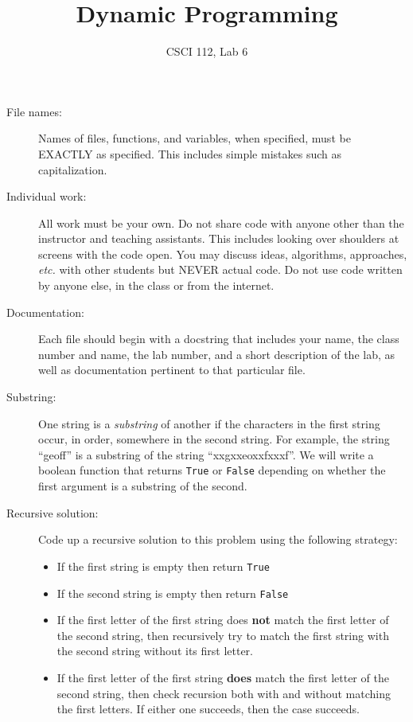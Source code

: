 \documentclass{article}
\title{Dynamic Programming}
\author{CSCI 112, Lab 6}
\date{}
\begin{document}
\sloppy

\maketitle

\begin{description} 
\item[File names:]  Names of files, functions, and variables, 
when specified,
must be EXACTLY as specified.  This includes simple mistakes such
as capitalization.

\item[Individual work:]  All work must be your own.  Do not share
code with anyone other than the instructor and teaching assistants.
This includes looking over shoulders at screens with the code open.
You may discuss ideas, algorithms, approaches, {\em etc.} with
other students but NEVER actual code.  Do not use code
written by anyone else, in the class or from the internet.

\item[Documentation:] Each file should begin with a docstring
that includes your name, the class number and name, the lab
number, and  
a short description of the lab, as well as documentation pertinent
to that particular file.

\item[Substring:] One string is a {\em substring} of another
if the characters in the first string occur, in order, somewhere in
the second string.  For example, the string ``geoff'' is a substring
of the string ``xxgxxeoxxfxxxf''.  We will write a boolean
function that returns {\tt True} or {\tt False} depending on
whether the first argument is a substring of the second.

\item[Recursive solution:] Code up a recursive solution to
this problem using the following strategy:
\begin{itemize}
\item If the first string is empty then return {\tt True}
\item If the second string is empty then return {\tt False}
\item If the first letter of the first string does {\bf not}
match the first letter of the second string, then
recursively try to match the first string with the
second string without its first letter.
\item If the first letter of the first string {\bf does}
match the first letter of the second string,
then check recursion both with and without
matching the first letters.  If either one succeeds,
then the case succeeds.
\end{itemize}


\end{description}
\end{document}
